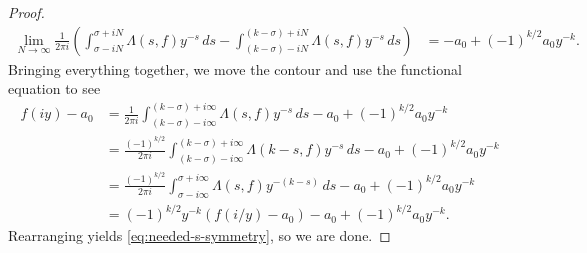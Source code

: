 \documentclass{amsart}
\begin{document}
\begin{proof}
	\begin{align*}
		\lim_{N\to\infty}\frac1{2\pi i}\left(\int_{\sigma-iN}^{\sigma+iN}\Lambda(s,f)y^{-s}\,ds-\int_{(k-\sigma)-iN}^{(k-\sigma)+iN}\Lambda(s,f)y^{-s}\,ds\right) &= -a_0+(-1)^{k/2}a_0y^{-k}.
	\end{align*}
	Bringing everything together, we move the contour and use the functional equation to see
	\begin{align*}
		f(iy)-a_0 &= \frac1{2\pi i}\int_{(k-\sigma)-i\infty}^{(k-\sigma)+i\infty}\Lambda(s,f)y^{-s}\,ds-a_0+(-1)^{k/2}a_0y^{-k} \\
		&= \frac{(-1)^{k/2}}{2\pi i}\int_{(k-\sigma)-i\infty}^{(k-\sigma)+i\infty}\Lambda(k-s,f)y^{-s}\,ds-a_0+(-1)^{k/2}a_0y^{-k} \\
		&= \frac{(-1)^{k/2}}{2\pi i}\int_{\sigma-i\infty}^{\sigma+i\infty}\Lambda(s,f)y^{-(k-s)}\,ds-a_0+(-1)^{k/2}a_0y^{-k} \\
		&= (-1)^{k/2}y^{-k}(f(i/y)-a_0)-a_0+(-1)^{k/2}a_0y^{-k}.
	\end{align*}
	Rearranging yields \eqref{eq:needed-s-symmetry}, so we are done.
\end{proof}


\printbibliography[title={References}]
\end{document}
